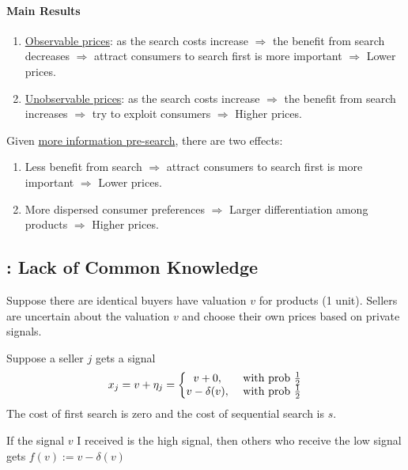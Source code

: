 \documentclass[11pt]{elegantbook}
\begin{document}
\paragraph*{Main Results}
\begin{enumerate}
    \item \underline{Observable prices}: as the search costs increase $\Rightarrow$ the benefit from search decreases $\Rightarrow$ attract consumers to search first is more important $\Rightarrow$ Lower prices.
    \item \underline{Unobservable prices}: as the search costs increase $\Rightarrow$ the benefit from search increases $\Rightarrow$ try to exploit consumers $\Rightarrow$ Higher prices.
\end{enumerate}
Given \underline{more information pre-search}, there are two effects:
\begin{enumerate}
    \item Less benefit from search $\Rightarrow$ attract consumers to search first is more important $\Rightarrow$ Lower prices.
    \item More dispersed consumer preferences $\Rightarrow$ Larger differentiation among products $\Rightarrow$ Higher prices.
\end{enumerate}



\subsection{\cite{kuksov2006search}: Lack of Common Knowledge}
Suppose there are identical buyers have valuation $v$ for products (1 unit). Sellers are uncertain about the valuation $v$ and choose their own prices based on private signals.

Suppose a seller $j$ gets a signal
\begin{equation}
    \begin{aligned}
        x_j=v+\eta_j=\left\{\begin{matrix}
            v+0,& \textnormal{ with prob }\frac{1}{2}\\
            v-\delta(v),& \textnormal{ with prob }\frac{1}{2}
        \end{matrix}\right.
    \end{aligned}
    \nonumber
\end{equation}
The cost of first search is zero and the cost of sequential search is $s$.

If the signal $v$ I received is the high signal, then others who receive the low signal gets $f(v):=v-\delta(v)$
\end{document}

